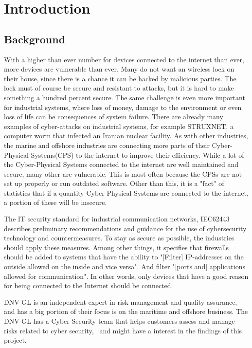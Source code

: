 \section{Introduction} \label{sec:intro}

\subsection{Background} \label{sec:background}
With a higher than ever number for devices connected to the internet than ever\cite{iot_stats}, more devices are vulnerable than ever. Many do not want an wireless lock on their house, since there is a chance it can be hacked by malicious parties. The lock must of course be secure and resistant to attacks, but it is hard to make something a hundred percent secure. The same challenge is even more important for industrial systems, where loss of money, damage to the environment or even loss of life can be consequences of system failure. There are already many examples of cyber-attacks on industrial systems, for example STRUXNET\cite{struxnet}, a computer worm that infected an Iranian nuclear facility. 
As with other industries, the marine and offshore industries are connecting more parts of their Cyber-Physical Systems(CPS) to the internet to improve their efficiency. While a lot of the Cyber-Physical Systems connected to the internet are well maintained and secure, many other are vulnerable. This is most often because the CPSs are not set up properly or run outdated software. Other than this, it is a "fact" of statistics that if a quantity Cyber-Physical Systems are connected to the internet, a portion of these will be insecure. 

The IT security standard for industrial communication networks, IEC62443 describes preliminary recommendations and guidance for the use of cybersecurity technology and countermeasures. To stay as secure as possible, the industries should apply these measures.\cite{IEC62443} Among other things, it specifies that firewalls should be added to systems that have the ability to "[Filter] IP-addresses on the outside allowed on the inside and vice versa". And filter "[ports and] applications allowed for communication". In other words, only devices that have a good reason for being connected to the Internet should be connected. 

DNV-GL is an independent expert in risk management and quality assurance, and has a big portion of their focus is on the maritime and offshore business. The DNV-GL has a Cyber Security team that helps customers assess and manage risks related to cyber security,~\cite{DNVGL_cybersec} and might have a interest in the findings of this project.

